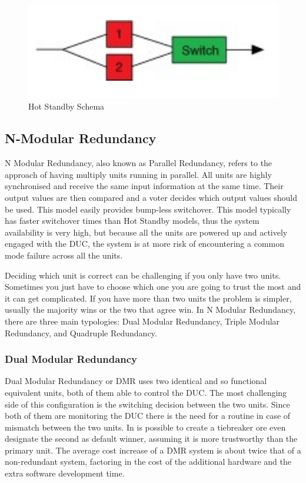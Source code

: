 \documentclass[./dissertation.tex]{subfiles}
\begin{document}
\begin{figure}[h!]
\centering
  \includegraphics[scale = 0.50]{imgs/hotred.png}
  \caption{Hot Standby Schema}
  \label{fig:hotred}
\end{figure}
\subsection{N-Modular Redundancy}
N Modular Redundancy, also known as Parallel Redundancy, refers to the approach of having multiply units running in parallel. All units are highly synchronised and receive the same input information at the same time. Their output values are then compared and a voter decides which output values should be used. This model easily provides bump-less switchover.
This model typically has faster switchover times than Hot Standby models, thus the system availability is very high, but because all the units are powered up and actively engaged with the DUC, the system is at more risk of encountering a common mode failure across all the units.

Deciding which unit is correct can be challenging if you only have two units. Sometimes you just have to choose which one you are going to trust the most and it can get complicated. If you have more than two units the problem is simpler, usually the majority wins or the two that agree win. In N Modular Redundancy, there are three main typologies: Dual Modular Redundancy, Triple Modular Redundancy, and Quadruple Redundancy.


\subsubsection{Dual Modular Redundancy}
Dual Modular Redundancy or DMR uses two identical and so functional equivalent units, both of them able to control the DUC. The most challenging side of this configuration is the switching decision between the two units. Since both of them are monitoring the DUC there is the need for a routine in case of mismatch between the two units. In is possible to create a tiebreaker ore even designate the second as default winner, assuming it is more trustworthy than the primary unit. 
The average cost increase of a DMR system is about twice that of a non-redundant system, factoring in the cost of the additional hardware and the extra software development time.
\end{document}
